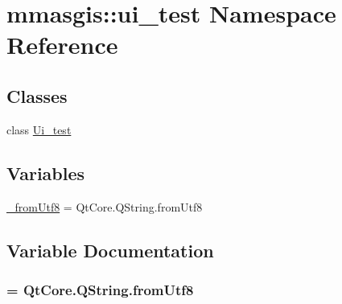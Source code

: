 \hypertarget{namespacemmasgis_1_1ui__test}{
\section{mmasgis::ui\_\-test Namespace Reference}
\label{namespacemmasgis_1_1ui__test}
}
\subsection*{Classes}
\begin{DoxyCompactItemize}
\item 
class \hyperlink{classmmasgis_1_1ui__test_1_1Ui__test}{Ui\_\-test}
\end{DoxyCompactItemize}
\subsection*{Variables}
\begin{DoxyCompactItemize}
\item 
\hyperlink{namespacemmasgis_1_1ui__test_ac3357b8b712a74d7fe2a8f05653fbe4e}{\_\-fromUtf8} = QtCore.QString.fromUtf8
\end{DoxyCompactItemize}


\subsection{Variable Documentation}
\hypertarget{namespacemmasgis_1_1ui__test_ac3357b8b712a74d7fe2a8f05653fbe4e}{
\subsubsection[{\_\-fromUtf8}]{ = QtCore.QString.fromUtf8}}
\label{namespacemmasgis_1_1ui__test_ac3357b8b712a74d7fe2a8f05653fbe4e}
